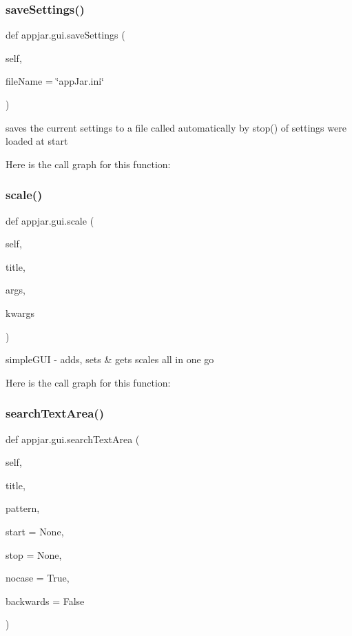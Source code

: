 \begin{DoxyVerb}
\subsubsection{\texorpdfstring{save\+Settings()}{saveSettings()}}
{\footnotesize\ttfamily def appjar.\+gui.\+save\+Settings (\begin{DoxyParamCaption}\item[{}]{self,  }\item[{}]{file\+Name = {\ttfamily \char`\"{}appJar.ini\char`\"{}} }\end{DoxyParamCaption})}

\begin{DoxyVerb}saves the current settings to a file
    called automatically by stop() of settings were loaded at start \end{DoxyVerb}
 Here is the call graph for this function\+:
\mbox{\label{classappjar_1_1gui_ab35721225a586baa2f80286c640e660e}} 
\subsubsection{\texorpdfstring{scale()}{scale()}}
{\footnotesize\ttfamily def appjar.\+gui.\+scale (\begin{DoxyParamCaption}\item[{}]{self,  }\item[{}]{title,  }\item[{}]{args,  }\item[{}]{kwargs }\end{DoxyParamCaption})}

\begin{DoxyVerb}simpleGUI - adds, sets & gets scales all in one go \end{DoxyVerb}
 Here is the call graph for this function\+:
\mbox{\label{classappjar_1_1gui_ad01d6ad33f36f7dea2db036885e41d36}} 
\subsubsection{\texorpdfstring{search\+Text\+Area()}{searchTextArea()}}
{\footnotesize\ttfamily def appjar.\+gui.\+search\+Text\+Area (\begin{DoxyParamCaption}\item[{}]{self,  }\item[{}]{title,  }\item[{}]{pattern,  }\item[{}]{start = {\ttfamily None},  }\item[{}]{stop = {\ttfamily None},  }\item[{}]{nocase = {\ttfamily True},  }\item[{}]{backwards = {\ttfamily False} }\end{DoxyParamCaption})}


\end{DoxyVerb}

